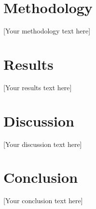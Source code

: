 \documentclass[12pt,letterpaper]{article}
\begin{document}
\section{Methodology}
[Your methodology text here]

\section{Results}
[Your results text here]

\section{Discussion}
[Your discussion text here]

\section{Conclusion}
[Your conclusion text here]

\printbibliography[heading=bibintoc,title={References}]
\end{document}

